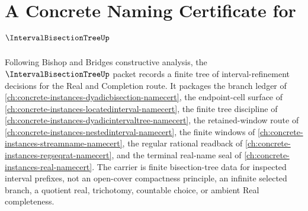 \chapter{A Concrete Naming Certificate for $\IntervalBisectionTreeUp$}
\label{ch:concrete-instances-interval-bisection-tree-namecert}

Following Bishop and Bridges constructive analysis, the $\IntervalBisectionTreeUp$ packet records a finite tree of interval-refinement decisions for the Real and Completion route. It packages the branch ledger of \autoref{ch:concrete-instances-dyadicbisection-namecert}, the endpoint-cell surface of \autoref{ch:concrete-instances-locatedinterval-namecert}, the finite tree discipline of \autoref{ch:concrete-instances-dyadicintervaltree-namecert}, the retained-window route of \autoref{ch:concrete-instances-nestedinterval-namecert}, the finite windows of \autoref{ch:concrete-instances-streamname-namecert}, the regular rational readback of \autoref{ch:concrete-instances-regseqrat-namecert}, and the terminal real-name seal of \autoref{ch:concrete-instances-real-namecert}. The carrier is finite bisection-tree data for inspected interval prefixes, not an open-cover compactness principle, an infinite selected branch, a quotient real, trichotomy, countable choice, or ambient Real completeness.

